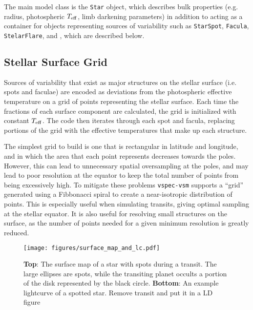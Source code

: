 \documentclass[twocolumn]{aastex631}
\newcommand{\teff}{$T_{\rm eff}$}
\newcommand{\TJ}[1]{\textcolor{tedcommentcolor}{#1}}
\begin{document}
The main model class is the \texttt{Star} object, which describes bulk properties (e.g. radius, photospheric \teff, limb darkening parameters) in addition to acting as 
a container for objects representing sources of variability such as \texttt{StarSpot}, \texttt{Facula}, \texttt{StelarFlare}, and , which are described below.

\subsection{Stellar Surface Grid}
Sources of variability that exist as major structures on the stellar surface (i.e. spots and faculae) are encoded as deviations from the photospheric effective temperature on a grid of points representing the stellar surface. Each time the fractions of each surface component are calculated, the grid is initialized with constant \teff. The code then iterates through each spot and facula, replacing portions of the grid with the effective temperatures that make up each structure.

The simplest grid to build is one that is rectangular in latitude and longitude, and in which the area that each point represents decreases towards the poles. However, this can lead to unnecessary spatial oversampling at the poles, and may lead to poor resolution at the equator to keep the total number of points from being excessively high. To mitigate these problems \texttt{vspec-vsm} supports a ``grid'' generated using a Fibbonacci spiral to create a near-isotropic distribution of points. This is especially useful when simulating transits, giving optimal sampling at the stellar equator. It is also useful for resolving small structures on the surface, as the number of points needed for a given minimum resolution is greatly reduced.


\begin{figure}
    \centering
        \texttt{[image: figures/surface\_map\_and\_lc.pdf]}
    \caption{{\bf Top}: The surface map of a star with spots during a transit.
    The large ellipses are spots, while the transiting planet occults a portion of the disk represented by the black circle.
    {\bf Bottom}: An example lightcurve of a spotted star.
    \TJ{Remove transit and put it in a LD figure}}
    \label{fig:surface_map}
\end{figure}
\end{document}

